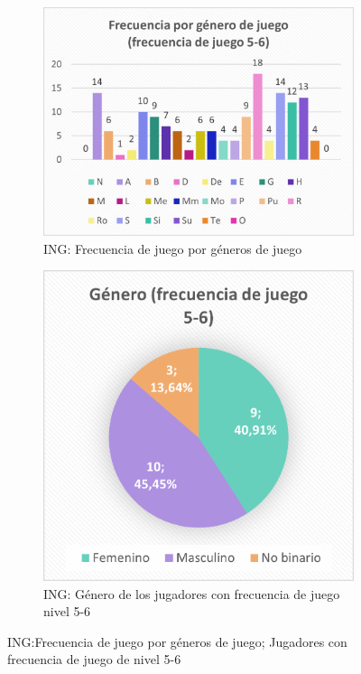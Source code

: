 \documentclass[12pt, a4paper,twoside,titlepage]{book}
\begin{document}
\begin{figure}
\centering
\begin{subfigure}{.6\textwidth}
  \centering
  \includegraphics[width=.95\linewidth]{ANEXO ING/5AnexINGFre56}
  \caption{ING: Frecuencia de juego por géneros de juego}
\end{subfigure}%
\begin{subfigure}{.4\textwidth}
  \centering
  \includegraphics[width=.95\linewidth]{ANEXO ING/6Anex56Gen}
  \caption{ING: Género de los jugadores con frecuencia de juego nivel 5-6}
\end{subfigure}
\caption{ING:Frecuencia de juego por géneros de juego; Jugadores con frecuencia de juego de nivel 5-6}
\end{figure}
\end{document}
